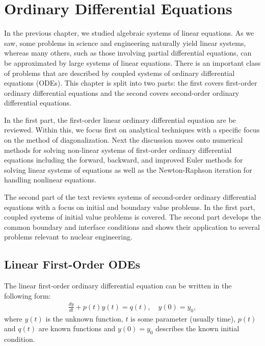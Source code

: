 \chapter{Ordinary Differential Equations} \label{Sec:ode}

In the previous chapter, we studied algebraic systems of linear equations. As we saw, some problems in science and engineering naturally yield linear systems, whereas many others, such as those involving partial differential equations, can be approximated by large systems of linear equations. There is an important class of problems that are described by coupled systems of ordinary differential equations (ODEs). This chapter is split into two parts: the first covers first-order ordinary differential equations and the second covers second-order ordinary differential equations.

In the first part, the first-order linear ordinary differential equation are be reviewed. Within this, we focus first on analytical techniques with a specific focus on the method of diagonalization. Next the discussion moves onto numerical methods for solving non-linear systems of first-order ordinary differential equations including the forward, backward, and improved Euler methods for solving linear systems of equations as well as the Newton-Raphson iteration for handling nonlinear equations.

The second part of the text reviews systems of second-order ordinary differential equations with a focus on initial and boundary value problems. In the first part, coupled systems of initial value problems is covered. The second part develops the common boundary and interface conditions and shows their application to several problems relevant to nuclear engineering.

\section{Linear First-Order ODEs}

The linear first-order ordinary differential equation can be written in the following form:
\begin{align}
  \frac{dy}{dt} + p(t) y(t) = q(t), \quad y(0) = y_0,
\end{align}
where $y(t)$ is the unknown function, $t$ is some parameter (usually time), $p(t)$ and $q(t)$ are known functions and $y(0) = y_0$ describes the known initial condition.

